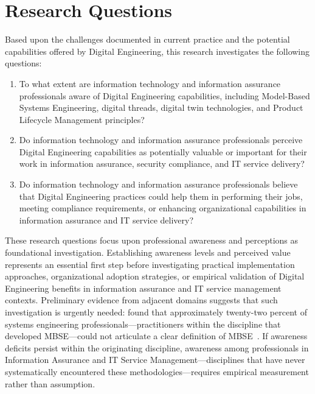 \section{Research Questions}

Based upon the challenges documented in current practice and the potential capabilities offered by Digital Engineering, this research investigates the following questions:

\begin{enumerate}
  \item To what extent are information technology and information assurance professionals aware of Digital Engineering capabilities, including Model-Based Systems Engineering, digital threads, digital twin technologies, and Product Lifecycle Management principles?

  \item Do information technology and information assurance professionals perceive Digital Engineering capabilities as potentially valuable or important for their work in information assurance, security compliance, and IT service delivery?

  \item Do information technology and information assurance professionals believe that Digital Engineering practices could help them in performing their jobs, meeting compliance requirements, or enhancing organizational capabilities in information assurance and IT service delivery?
\end{enumerate}

These research questions focus upon professional awareness and perceptions as foundational investigation. Establishing awareness levels and perceived value represents an essential first step before investigating practical implementation approaches, organizational adoption strategies, or empirical validation of Digital Engineering benefits in information assurance and IT service management contexts. Preliminary evidence from adjacent domains suggests that such investigation is urgently needed: \citeauthor{Henderson_McDermott_Salado_2024} found that approximately twenty-two percent of systems engineering professionals---practitioners within the discipline that developed MBSE---could not articulate a clear definition of MBSE~\parencite{Henderson_McDermott_Salado_2024}. If awareness deficits persist within the originating discipline, awareness among professionals in Information Assurance and IT Service Management---disciplines that have never systematically encountered these methodologies---requires empirical measurement rather than assumption.

